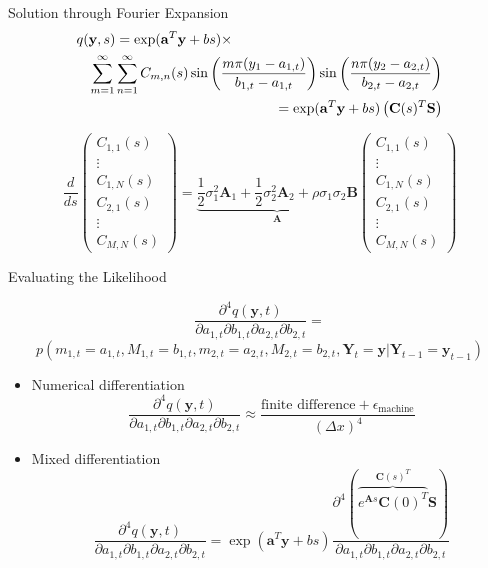 \documentclass{beamer}
\newcommand{\by} {\mathbf{y}}
\newcommand{\bfY} {\mathbf{Y}}
\begin{document}
\begin{frame}{Solution through Fourier Expansion}
\begin{eqnarray*}
\lefteqn{	q(\mathbf{y}, s) = \exp(\mathbf{a}^T \by + bs) \times } \\
	&& \sum_{m=1}^\infty \sum_{n=1}^\infty C_{m,n}(s) \sin\left( \frac{m \pi (y_1 - a_{1,t})}{b_{1,t} - a_{1,t}} \right) \sin\left( \frac{n \pi (y_2 - a_{2,t})}{b_{2,t} - a_{2,t}} \right) \\
	&&= \exp(\mathbf{a}^T \by + bs) \left(  \mathbf{C}(s)^T \mathbf{S} \right)
\end{eqnarray*}

\begin{equation*}
	\frac{d}{ds} \left( \begin{array}{c} 
			C_{1,1}(s) \\
				\vdots \\
			C_{1,N}(s) \\
			C_{2,1}(s) \\
				\vdots \\
			C_{M,N}(s)
		\end{array} \right) = \underbrace{ \frac{1}{2}\sigma^2_1 \mathbf{A}_1 + \frac{1}{2}\sigma^2_2 \mathbf{A}_2 + \rho\sigma_1 \sigma_2 \mathbf{B} }_{\mathbf{A}} \left( \begin{array}{c} 
			C_{1,1}(s) \\
				\vdots \\
			C_{1,N}(s) \\
			C_{2,1}(s) \\
				\vdots \\
			C_{M,N}(s)
		\end{array} \right) \label{eq:matrix-representation}
\end{equation*}
\end{frame}



\begin{frame}{Evaluating the Likelihood}
	
\[ \frac{\partial^4 q(\by, t)}{\partial a_{1,t}\partial b_{1,t} \partial a_{2,t} \partial b_{2,t} } = \]
		\[p( m_{1,t} = a_{1,t}, M_{1,t} = b_{1,t}, m_{2,t} = a_{2,t}, M_{2,t} = b_{2,t}, \bfY_t = \by | \bfY_{t-1} = \by_{t-1}) \]

\pause	
\begin{itemize}
	\item Numerical differentiation 
		\[ \frac{\partial^4 q(\by, t)}{\partial a_{1,t}\partial b_{1,t} \partial a_{2,t} \partial b_{2,t} } \approx \frac{\mbox{finite difference} + \epsilon_{\mbox{machine}}}{ (\Delta x)^4 }  \]
	
	\pause
	\item Mixed differentiation
\[
	\frac{\partial^4 q(\by, t)}{\partial a_{1,t}\partial b_{1,t} \partial a_{2,t} \partial b_{2,t} } = \exp(\mathbf{a}^T \by + bs)\frac{\partial^4 (  \overbrace{ \boxed{ e^{\mathbf{A}s}\mathbf{C}(0) }^T }^{\mathbf{C}(s)^T} \mathbf{S} )}{\partial a_{1,t}\partial b_{1,t} \partial a_{2,t} \partial b_{2,t} }
\]
\end{itemize}

\end{frame}
\end{document}
